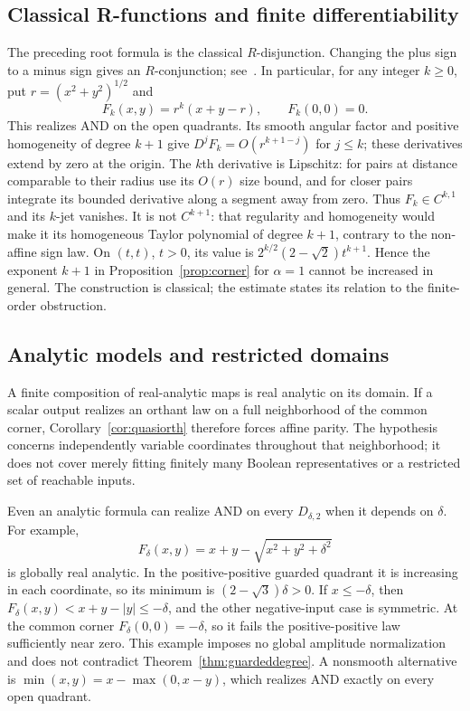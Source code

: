 \documentclass[11pt]{article}
\theoremstyle{definition}
\theoremstyle{remark}
\begin{document}
\subsection{Classical R-functions and finite differentiability}\label{sec:rfunctions}

The preceding root formula is the classical $R$-disjunction. Changing the plus sign to a minus sign gives an $R$-conjunction; see~\cite[Section~3.3, equations (3.4)--(3.5)]{Shapiro2007}. In particular, for any integer $k\ge0$, put $r=(x^2+y^2)^{1/2}$ and
\[
 F_k(x,y)=r^k(x+y-r),\qquad F_k(0,0)=0.
\]
This realizes AND on the open quadrants. Its smooth angular factor and positive homogeneity of degree $k+1$ give $D^jF_k=O(r^{k+1-j})$ for $j\le k$; these derivatives extend by zero at the origin. The $k$th derivative is Lipschitz: for pairs at distance comparable to their radius use its $O(r)$ size bound, and for closer pairs integrate its bounded derivative along a segment away from zero. Thus $F_k\in C^{k,1}$ and its $k$-jet vanishes. It is not $C^{k+1}$: that regularity and homogeneity would make it its homogeneous Taylor polynomial of degree $k+1$, contrary to the non-affine sign law. On $(t,t)$, $t>0$, its value is $2^{k/2}(2-\sqrt2)t^{k+1}$. Hence the exponent $k+1$ in Proposition~\ref{prop:corner} for $\alpha=1$ cannot be increased in general. The construction is classical; the estimate states its relation to the finite-order obstruction.

\subsection{Analytic models and restricted domains}

A finite composition of real-analytic maps is real analytic on its domain. If a scalar output realizes an orthant law on a full neighborhood of the common corner, Corollary~\ref{cor:quasiorth} therefore forces affine parity. The hypothesis concerns independently variable coordinates throughout that neighborhood; it does not cover merely fitting finitely many Boolean representatives or a restricted set of reachable inputs.

Even an analytic formula can realize AND on every $D_{\delta,2}$ when it depends on $\delta$. For example,
\[
 F_\delta(x,y)=x+y-\sqrt{x^2+y^2+\delta^2}
\]
is globally real analytic. In the positive-positive guarded quadrant it is increasing in each coordinate, so its minimum is $(2-\sqrt3)\delta>0$. If $x\le-\delta$, then $F_\delta(x,y)<x+y-|y|\le-\delta$, and the other negative-input case is symmetric. At the common corner $F_\delta(0,0)=-\delta$, so it fails the positive-positive law sufficiently near zero. This example imposes no global amplitude normalization and does not contradict Theorem~\ref{thm:guardeddegree}. A nonsmooth alternative is $\min(x,y)=x-\max(0,x-y)$, which realizes AND exactly on every open quadrant.
\end{document}
